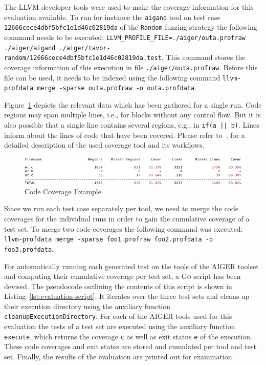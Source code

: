 The LLVM developer tools were used to make the coverage information for this evaluation available. To run for instance the \texttt{aigand} tool on test case \texttt{12666cece4dbf5bfc1e1d46c02819da} of the \texttt{Random} fuzzing strategy the following command needs to be executed: \texttt{LLVM\_PROFILE\_FILE=./aiger/outa.profraw ./aiger/aigand ./aiger/tavor-random/12666cece4dbf5bfc1e1d46c02819da.test}. This command stores the coverage information of this execution in file \texttt{./aiger/outa.profraw}. Before this file can be used, it needs to be indexed using the following command \texttt{llvm-profdata merge -sparse outa.profraw -o outa.profdata}.

Figure~\ref{fig:code-coverage} depicts the relevant data which has been gathered for a single run. Code regions may span multiple lines, i.e., for blocks without any control flow. But it is also possible that a single line contains several regions, e.g., in \texttt{if(a || b)}. Lines inform about the lines of code that have been covered. Please refer to~\cite{2017_llvm_code_coverage}, for a detailed description of the used coverage tool and its workflows.

\begin{figure}[t]
\includegraphics[width=\textwidth]{images/evaluation-code-coverage.png}
\caption{Code Coverage Example}
\label{fig:code-coverage}
\end{figure}

Since we run each test case separately per tool, we need to merge the code coverages for the individual runs in order to gain the cumulative coverage of a test set. To merge two code coverages the following command was executed: \texttt{llvm-profdata merge -sparse foo1.profraw foo2.profdata -o foo3.profdata}.

For automatically running each generated test on the tools of the AIGER toolset and computing their cumulative coverage per test set, a \textsc{Go} script has been devised. The pseudocode outlining the contents of this script is shown in Listing~\ref{lst:evaluation-script}. It iterates over the three test sets and cleans up their execution directory using the auxiliary function \texttt{cleanupExecutionDirectory}. For each of the AIGER tools used for this evaluation the tests of a test set are executed using the auxiliary function \texttt{execute}, which returns the coverage \texttt{c} as well as exit status \texttt{e} of the execution. These code coverages and exit states are stored and cumulated per tool and test set. Finally, the results of the evaluation are printed out for examination.

